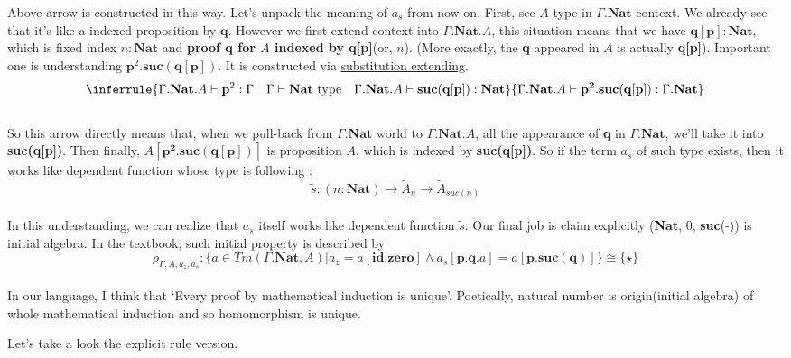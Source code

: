 \documentclass[12pt, a4paper, openany, twoside]{book}
\theoremstyle{definition}
\theoremstyle{remark}
\theoremstyle{plain}
\numberwithin{equation}{section}
\begin{document}
Above arrow is constructed in this way. 
Let's unpack the meaning of $a_s$ from now on. 
First, see $A$ type in $\Gamma.\mathbf{Nat}$ context. We already see that it's like a indexed proposition by $\mathbf{q}$. 
However we first extend context into $\Gamma.\mathbf{Nat}.A$, this situation means that 
we have $\mathbf{q}[\mathbf{p}] : \mathbf{Nat}$, which is fixed index $n : \mathbf{Nat}$ 
and \textbf{proof q for $A$ indexed by q[p]}(or, $n$). (More exactly, the \textbf{q} appeared in $A$ is actually \textbf{q[p]}). 
Important one is understanding $\mathbf{p}^2.\mathbf{suc}(\mathbf{q[p]})$. 
It is constructed via \hyperlink{subst extend}{substitution extending}. 
\\
\[
\inferrule
{
    \Gamma.\mathbf{Nat}.A \vdash \mathbf{p}^2 : \Gamma \quad \Gamma \vdash \mathbf{Nat} \text{ type} \quad \Gamma.\mathbf{Nat}.A \vdash \mathbf{suc(q[p])} : \mathbf{Nat}
}
{
    \Gamma.\mathbf{Nat}.A \vdash \mathbf{p^2.suc(q[p])} : \Gamma.\mathbf{Nat}
}
\]
\\
So this arrow directly means that, when we pull-back from $\Gamma.\mathbf{Nat}$ world to $\Gamma.\mathbf{Nat}.A$, 
all the appearance of \textbf{q} in $\Gamma.\mathbf{Nat}$, we'll take it into \textbf{suc(q[p])}. 
Then finally, $A[\mathbf{p^2}.\mathbf{suc(q[p])}]$ is proposition $A$, which is indexed by \textbf{suc(q[p])}. 
So if the term $a_s$ of such type exists, then it works like dependent function whose type is following : 
\[\tilde{s} : (n : \mathbf{Nat}) \rightarrow \tilde{A}_n \rightarrow \tilde{A}_{suc(n)}\]
\\
In this understanding, we can realize that $a_s$ itself works like dependent function $\tilde{s}$. 
Our final job is claim explicitly (\textbf{Nat}, 0, \textbf{suc}(-)) is initial algebra. 
In the textbook, such initial property is described by 
\[\rho_{\Gamma, A, a_z, a_s} : \{a \in Tm(\Gamma.\mathbf{Nat}, A) | a_z = a[\mathbf{id.zero}] \wedge a_s[\mathbf{p.q}.a] = a[\mathbf{p.suc(q)}]\} \cong \{\star\}\]
\\
In our language, I think that \lq Every proof by mathematical induction is unique'. 
Poetically, natural number is origin(initial algebra) of whole mathematical induction and so homomorphism is unique. 

Let's take a look the explicit rule version. 
\end{document}
